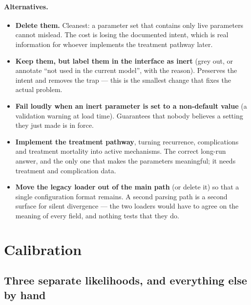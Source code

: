 \documentclass[12pt,a4paper]{article}
\newcommand{\alt}[1]{\paragraph{Alternatives.} #1}
\begin{document}
\alt{\begin{itemize}[nosep]
  \item \textbf{Delete them.} Cleanest: a parameter set that contains only live parameters cannot mislead.
        The cost is losing the documented intent, which is real information for whoever implements the
        treatment pathway later.
  \item \textbf{Keep them, but label them in the interface as inert} (grey out, or annotate ``not used in
        the current model'', with the reason). Preserves the intent and removes the trap --- this is the
        smallest change that fixes the actual problem.
  \item \textbf{Fail loudly when an inert parameter is set to a non-default value} (a validation warning at
        load time). Guarantees that nobody believes a setting they just made is in force.
  \item \textbf{Implement the treatment pathway}, turning recurrence, complications and treatment mortality
        into active mechanisms. The correct long-run answer, and the only one that makes the parameters
        meaningful; it needs treatment and complication data.
  \item \textbf{Move the legacy loader out of the main path} (or delete it) so that a single configuration
        format remains. A second parsing path is a second surface for silent divergence --- the two loaders
        would have to agree on the meaning of every field, and nothing tests that they do.
\end{itemize}}

\section{Calibration}
\label{sec:calib}

\subsection{Three separate likelihoods, and everything else by hand}
\end{document}
